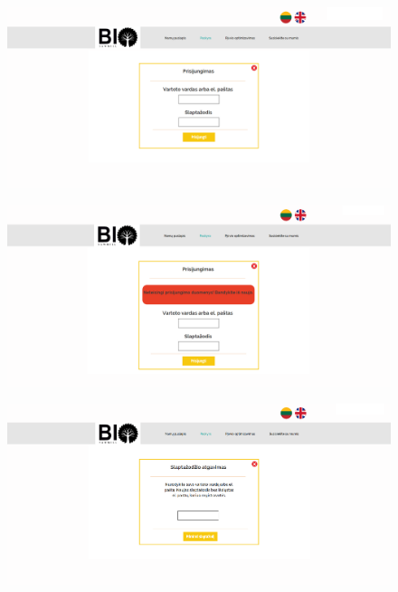 \documentclass[a4paper,12pt]{article}
\begin{document}
\begin{figure}[!tph]
\hspace{-3cm}
\centering
\includegraphics[scale=0.5]{interfeisai/paskyrosPuslapisPrisijungimas}
\label{fig:verticalcell}
\end{figure}

\begin{figure}[!tph]
\hspace{-3cm}
\centering
\includegraphics[scale=0.5]{interfeisai/paskyrosPuslapisPrisijungimasSuKlaida}
\label{fig:verticalcell}
\end{figure}

\begin{figure}[!tph]
\hspace{-3cm}
\centering
\includegraphics[scale=0.5]{interfeisai/paskyrosPuslapisPamirstasSlaptazodis}
\label{fig:verticalcell}
\end{figure}
\end{document}
